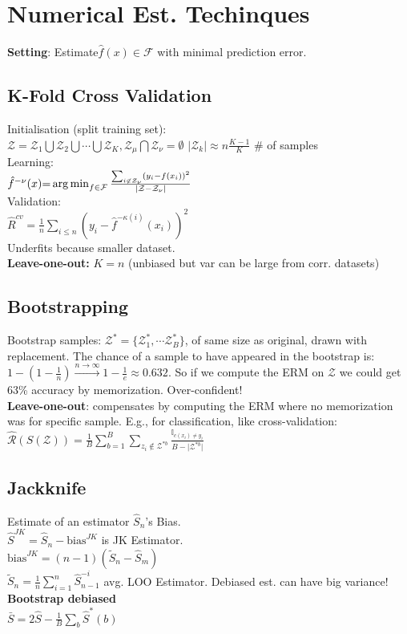 \section*{Numerical Est. Techinques}
\textbf{Setting}: Estimate$\hat{f}(x) \in \mathcal{F}$ with minimal prediction error.

\subsection*{K-Fold Cross Validation}
Initialisation (split training set):\\
$\mathcal{Z}=\mathcal{Z}_1\bigcup\mathcal{Z}_2\bigcup\cdots\bigcup\mathcal{Z}_K, \mathcal{Z}_\mu \bigcap\mathcal{Z}_\nu = \emptyset $
$|\mathcal{Z}_k|\approx n\frac{K-1}{K}$ \# of samples\\
Learning:\\
$\hat{f}^{-\nu}(x){=}
\operatorname*{arg\,min}_{f\in\mathcal{F}}\frac{\sum_{i\not\in\mathcal{Z}_\nu}(y_i-f(x_i))^2}{|\mathcal{Z}-\mathcal{Z}_{\nu}|}$\\
Validation:\\
$\hat{R}^{cv} = \frac{1}{n}\sum_{i\leq n}(y_i-\hat{f}^{-\kappa(i)}(x_i))^2$\\
Underfits because smaller dataset.\\
\textbf{Leave-one-out:} $K=n$ (unbiased but var can be large from corr. datasets)

\subsection*{Bootstrapping}
Bootstrap samples: $\mathcal{Z}^*=\{\mathcal{Z}_1^*, \cdots\mathcal{Z}_B^*\}$, of same size as original, drawn with replacement.
The chance of a sample to have appeared in the bootstrap is:\\
$1-(1-\frac{1}{n})\stackrel{n\to\infty}{\to} 1-\frac{1}{e}\approx 0.632$. So if we compute the ERM on $\mathcal{Z}$ we could get 63\% accuracy by memorization. Over-confident!\\
\textbf{Leave-one-out}: compensates by computing the ERM where no memorization was for specific sample. E.g., for classification, like cross-validation:\\
$\hat{\mathcal{R}}(S(\mathcal{Z}))=\frac{1}{B}\sum_{b=1}^B\sum_{z_i\not\in\mathcal{Z}^{*b}}\frac{\mathbb{I}_{c(x_i)\neq y_i}}{B-\lvert\mathcal{Z}^{*b}\rvert}$

\subsection*{Jackknife}
Estimate of an estimator $\hat{S}_n$'s Bias.\\
$\hat{S}^{JK}=\hat{S}_n-\mathrm{bias}^{JK}$ is JK Estimator.\\
$\mathrm{bias}^{JK}{=}(n{-}1)(\tilde{S}_n{-}\hat{S}_m)$\\
$\tilde{S}_n{=}\frac{1}{n}\sum_{i=1}^n\hat{S}_{n{-}1}^{-i}$ avg. LOO Estimator.
Debiased est. can have big variance!\\
\textbf{Bootstrap debiased}\\ $\bar{S}{=}2\hat{S}{-}\frac{1}{B}\sum_b\hat{S}^*(b)$

